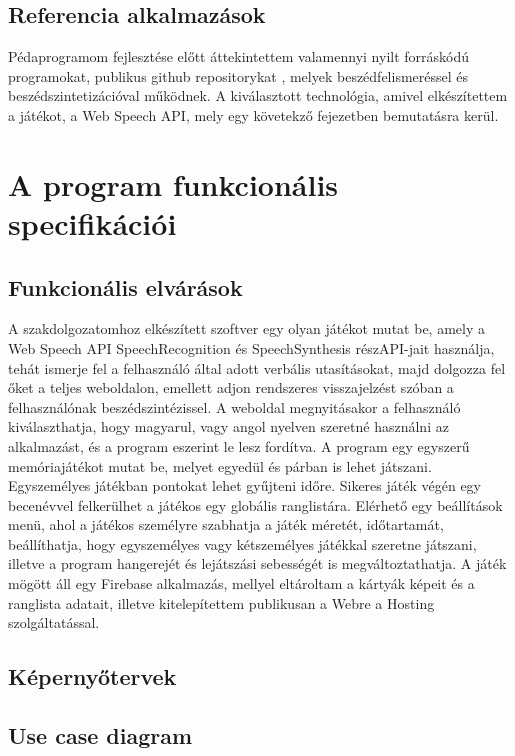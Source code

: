 \documentclass[12pt]{report}
\begin{document}
\section{Referencia alkalmazások}
Pédaprogramom fejlesztése előtt áttekintettem valamennyi nyilt forráskódú programokat, publikus github repositorykat \cite{web-speech-angular}\cite{pacman}\cite{audio-games}, melyek beszédfelismeréssel és beszédszintetizációval működnek. A kiválasztott technológia, amivel elkészítettem a játékot, a Web Speech API, mely egy követekző fejezetben bemutatásra kerül.

\chapter{A program funkcionális specifikációi}
\section{Funkcionális elvárások}
A szakdolgozatomhoz elkészített szoftver egy olyan játékot mutat be, amely a Web Speech API SpeechRecognition és SpeechSynthesis részAPI-jait használja, tehát ismerje fel a felhasználó által adott verbális utasításokat, majd dolgozza fel őket a teljes weboldalon, emellett adjon rendszeres visszajelzést szóban a felhasználónak beszédszintézissel.
\newline
A weboldal megnyitásakor a felhasználó kiválaszthatja, hogy magyarul, vagy angol nyelven szeretné használni az alkalmazást, és a program eszerint le lesz fordítva.
\newline
A program egy egyszerű memóriajátékot mutat be, melyet egyedül és párban is lehet játszani. Egyszemélyes játékban pontokat lehet gyűjteni időre. Sikeres játék végén egy becenévvel felkerülhet a játékos egy globális ranglistára.
\newline
Elérhető egy beállítások menü, ahol a játékos személyre szabhatja a játék méretét, időtartamát, beállíthatja, hogy egyszemélyes vagy kétszemélyes játékkal szeretne játszani, illetve a program hangerejét és lejátszási sebességét is megváltoztathatja.
\newline
A játék mögött áll egy Firebase alkalmazás, mellyel eltároltam a kártyák képeit és a ranglista adatait, illetve kitelepítettem publikusan a Webre a Hosting szolgáltatással.
\pagebreak
\section{Képernyőtervek}
\section{Use case diagram}
\end{document}
